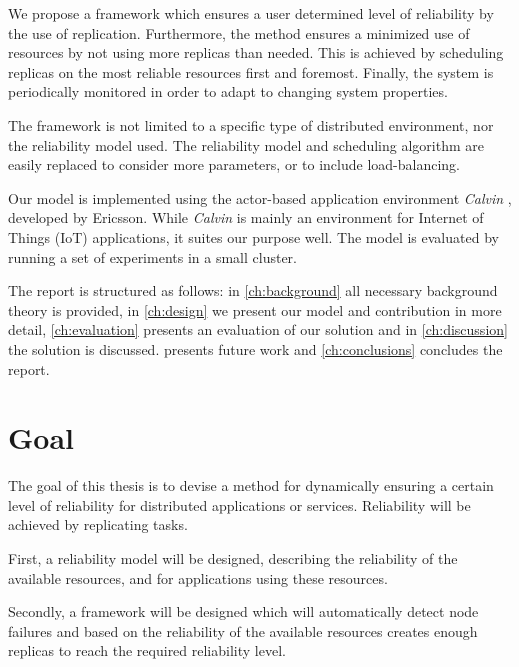 \documentclass{cslthse-msc}
\begin{document}
We propose a framework which ensures a user determined level of reliability by the use of replication. Furthermore, the method ensures a minimized use of resources by not using more replicas than needed. This is achieved by scheduling replicas on the most reliable resources first and foremost. Finally, the system is periodically monitored in order to adapt to changing system properties.

The framework is not limited to a specific type of distributed environment, nor the reliability model used. The reliability model and scheduling algorithm are easily replaced to consider more parameters, or to include load-balancing. %


Our model is implemented using the actor-based application environment \emph{Calvin} \cite{calvin}, developed by Ericsson. While \emph{Calvin} is mainly an environment for Internet of Things (IoT) applications, it suites our purpose well. The model is evaluated by running a set of experiments in a small cluster. %

The report is structured as follows: in \cref{ch:background} all necessary background theory is provided, in \cref{ch:design} we present our model and contribution in more detail, \cref{ch:evaluation} presents an evaluation of our solution and in \cref{ch:discussion} the solution is discussed.  presents future work and \cref{ch:conclusions} concludes the report. 

\section{Goal} \label{sec:introduction_goals}
The goal of this thesis is to devise a method for dynamically ensuring a certain level of reliability for distributed applications or services. Reliability will be achieved by replicating tasks.

First, a reliability model will be designed, describing the reliability of the available resources, and for applications using these resources.

Secondly, a framework will be designed which will automatically detect node failures and based on the reliability of the available resources creates enough replicas to reach the required reliability level.
\end{document}
